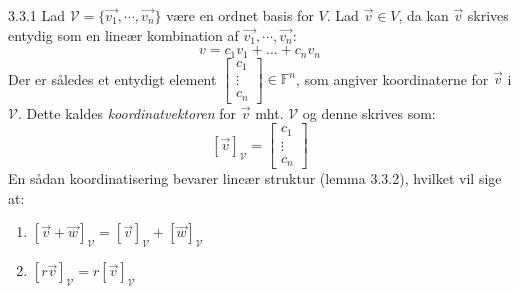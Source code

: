 \begin{definition}{3.3.1}
	Lad $\mathcal{V} = \{\vec{v_1}, \cdots, \vec{v_n}\}$ være en ordnet basis 
	for $V$. Lad $\vec{v} \in V$, da kan $\vec{v}$ skrives entydig som en 
	lineær kombination af $\vec{v_1}, \cdots, \vec{v_n}$:
	\[
		v = c_1v_1 + \ldots + c_nv_n
	\]
	Der er således et entydigt element $\begin{bmatrix}c_1\\ \vdots \\ c_n
	\end{bmatrix} \in \mathbb{F}^n$, som angiver koordinaterne for $\vec{v}$ i
	$\mathcal{V}$. Dette kaldes \textit{koordinatvektoren} for $\vec{v}$ mht.
	$\mathcal{V}$ og denne skrives som:
	\[
		[\vec{v}]_\mathcal{V} = \begin{bmatrix}c_1\\ \vdots \\ c_n\end{bmatrix}
	\]
	En sådan koordinatisering bevarer lineær struktur (lemma 3.3.2), hvilket 
	vil sige at:
	\begin{enumerate}
		\item $[\vec{v} + \vec{w}]_\mathcal{V} = [\vec{v}]_\mathcal{V} + 
			[\vec{w}]_\mathcal{V}$
		\item $[r\vec{v}]_\mathcal{V} = r [\vec{v}]_\mathcal{V}$
	\end{enumerate}
\end{definition}
